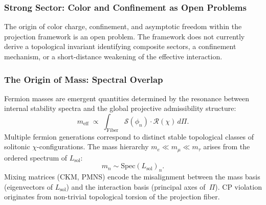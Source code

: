 \subsubsection*{Strong Sector: Color and Confinement as Open Problems}
\label{subsec:qcd-topology}

The origin of color charge, confinement, and asymptotic freedom within
the projection framework is an open problem.
The framework does not currently derive a topological invariant
identifying composite sectors, a confinement mechanism, or a
short-distance weakening of the effective interaction.

\subsubsection*{The Origin of Mass: Spectral Overlap}
\label{subsec:yukawa-overlap}

Fermion masses are emergent quantities determined by the resonance
between internal stability spectra and the global projective admissibility structure:
\begin{equation}
  m_{\mathrm{eff}} \;\propto\;
    \int_{\mathrm{Fiber}}
    \mathcal{S}(\phi_n) \cdot \mathcal{R}(\chi)
    \, d\Pi .
\end{equation}
Multiple fermion generations correspond to distinct stable topological
classes of solitonic $\chi$-configurations.
The mass hierarchy $m_e \ll m_\mu \ll m_\tau$ arises from the ordered
spectrum of $L_{\mathrm{sol}}$:
\begin{equation}
  m_n \sim \mathrm{Spec}(L_{\mathrm{sol}})_n .
\end{equation}
Mixing matrices (CKM, PMNS) encode the misalignment between the mass
basis (eigenvectors of $L_{\mathrm{sol}}$) and the interaction basis
(principal axes of~$\Pi$).
CP violation originates from non-trivial topological torsion of the
projection fiber.
